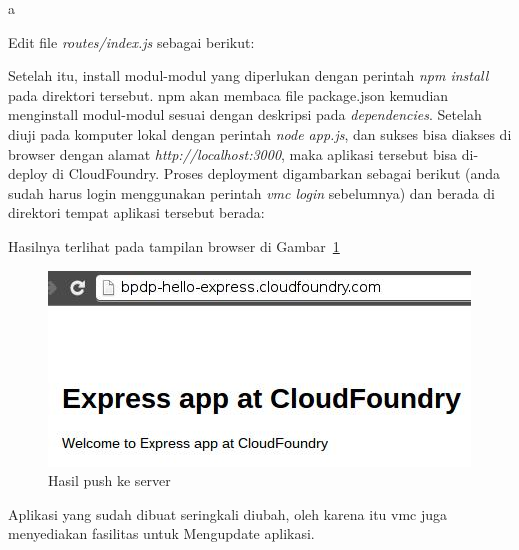 \lstset{language=Javascript,caption=app.js untuk ExpressJS}a


Edit file \textit{routes/index.js} sebagai berikut:

\lstset{language=Javascript,caption=Hasil edit routes/index.js}


Setelah itu, install modul-modul yang diperlukan dengan perintah \textit{npm install} pada direktori tersebut. npm akan membaca file package.json kemudian menginstall modul-modul sesuai dengan deskripsi pada \textit{dependencies}. Setelah diuji pada komputer lokal dengan perintah \textit{node app.js}, dan sukses bisa diakses di browser dengan alamat \textit{http://localhost:3000}, maka aplikasi tersebut bisa di-deploy di CloudFoundry. Proses deployment digambarkan sebagai berikut (anda sudah harus login menggunakan perintah \textit{vmc login} sebelumnya) dan berada di direktori tempat aplikasi tersebut berada:

\lstset{language=bash,caption=Deployment aplikasi ExpressJS ke CF}


Hasilnya terlihat pada tampilan browser di Gambar~\ref{fig:bab-01-hello}

  \begin{figure}
    \begin{center}
      \includegraphics[scale=0.5]{images/bpdp-hello-express.jpg}
    \end{center}
    \caption{Hasil push ke server}
    \label{fig:bab-01-hello}
  \end{figure}

Aplikasi yang sudah dibuat seringkali diubah, oleh karena itu vmc juga menyediakan fasilitas untuk Mengupdate aplikasi. 

\lstset{language=Javascript,caption=Update: menambahkan versi Node.js ke routes/index.js}


